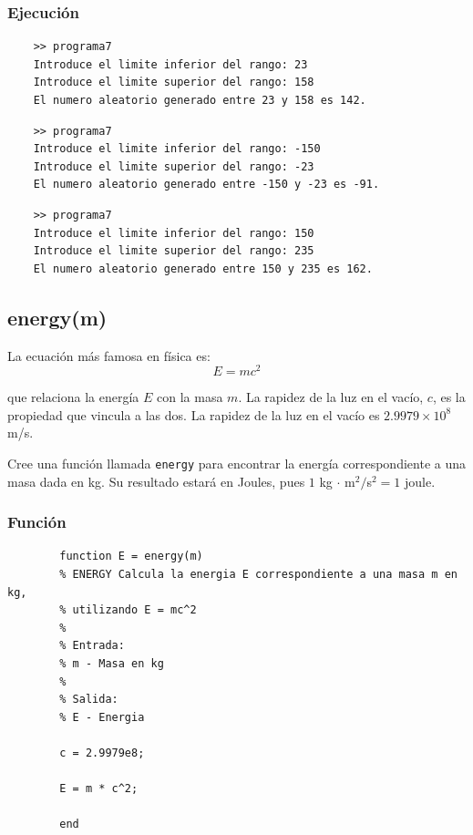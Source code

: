 \documentclass{article}
\begin{document}
	\subsubsection{Ejecución}
	
	\begin{lstlisting}
	>> programa7
	Introduce el limite inferior del rango: 23
	Introduce el limite superior del rango: 158
	El numero aleatorio generado entre 23 y 158 es 142.
	\end{lstlisting}
	
	\begin{lstlisting}
	>> programa7
	Introduce el limite inferior del rango: -150
	Introduce el limite superior del rango: -23
	El numero aleatorio generado entre -150 y -23 es -91.
	\end{lstlisting}
	
	\begin{lstlisting}
	>> programa7
	Introduce el limite inferior del rango: 150
	Introduce el limite superior del rango: 235
	El numero aleatorio generado entre 150 y 235 es 162.
	\end{lstlisting}
	\newpage
	
	\subsection{energy(m)}
	
	La ecuación más famosa en física es:
	\begin{equation*}
		E = m c^2
	\end{equation*}
	
	que relaciona la energía $E$ con la masa $m$. La rapidez de la luz en el vacío, $c$, es la propiedad que vincula a las dos. La rapidez de la luz en el vacío es $2.9979 \times 10^8$ m/s.
	
	Cree una función llamada \texttt{energy} para encontrar la energía correspondiente a una masa dada en kg. Su resultado estará en Joules, pues $1$ kg $\cdot$ m$^2/$s$^2 = 1$ joule.
	
	\subsubsection{Función}
	
	\begin{lstlisting}
		function E = energy(m)
		% ENERGY Calcula la energia E correspondiente a una masa m en kg, 
		% utilizando E = mc^2
		%
		% Entrada:
		% m - Masa en kg
		%
		% Salida:
		% E - Energia
		
		c = 2.9979e8;
		
		E = m * c^2;
		
		end
	\end{lstlisting}
	
\end{document}
